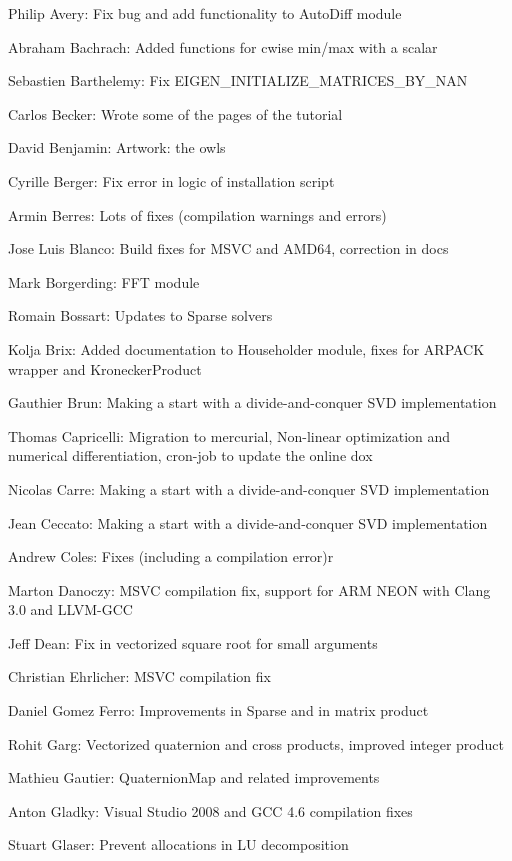 \vpara
Philip Avery:  Fix bug and add functionality to AutoDiff module  

Abraham Bachrach:  Added functions for cwise min/max with a scalar  

Sebastien Barthelemy:  Fix EIGEN\_INITIALIZE\_MATRICES\_BY\_NAN  

Carlos Becker:  Wrote some of the pages of the tutorial  

David Benjamin:  Artwork: the owls  

Cyrille Berger:  Fix error in logic of installation script  

Armin Berres:  Lots of fixes (compilation warnings and errors)  

Jose Luis Blanco:  Build fixes for MSVC and AMD64, correction in docs  

Mark Borgerding:  FFT module  

Romain Bossart:  Updates to Sparse solvers  

Kolja Brix:  Added documentation to Householder module, fixes for ARPACK wrapper and KroneckerProduct  

Gauthier Brun:  Making a start with a divide-and-conquer SVD implementation  

Thomas Capricelli:  Migration to mercurial, Non-linear optimization and numerical differentiation, cron-job to update the online dox 

Nicolas Carre:  Making a start with a divide-and-conquer SVD implementation  

Jean Ceccato:  Making a start with a divide-and-conquer SVD implementation  

Andrew Coles:  Fixes (including a compilation error)r  

Marton Danoczy:  MSVC compilation fix, support for ARM NEON with Clang 3.0 and LLVM-GCC  

Jeff Dean:  Fix in vectorized square root for small arguments  

Christian Ehrlicher:  MSVC compilation fix  

Daniel Gomez Ferro:  Improvements in Sparse and in matrix product  

Rohit Garg:  Vectorized quaternion and cross products, improved integer product  

Mathieu Gautier:  QuaternionMap and related improvements  

Anton Gladky:  Visual Studio 2008 and GCC 4.6 compilation fixes  

Stuart Glaser:  Prevent allocations in LU decomposition  

